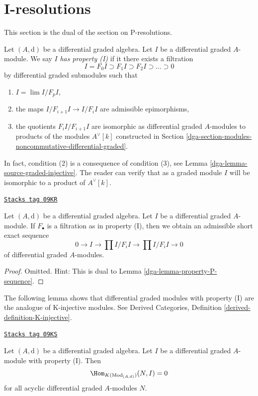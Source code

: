 \section{I-resolutions}
\label{dga-section-I-resolutions}
This section is the dual of the section on P-resolutions.

\medskip\noindent
Let $(A, \text{d})$ be a differential graded algebra.
Let $I$ be a differential graded $A$-module. We say $I$
{\it has property (I)} if it there exists a filtration
$$
I = F_0I \supset F_1I \supset F_2I \supset \ldots \supset 0
$$
by differential graded submodules such that
\begin{enumerate}
\item $I = \lim I/F_pI$,
\item the maps $I/F_{i + 1}I \to I/F_iI$ are admissible epimorphisms,
\item the quotients $F_iI/F_{i + 1}I$ are isomorphic as differential
graded $A$-modules to products of the modules $A^\vee[k]$ constructed
in Section \ref{dga-section-modules-noncommutative-differential-graded}.
\end{enumerate}
In fact, condition (2) is a consequence of condition (3), see
Lemma \ref{dga-lemma-source-graded-injective}. The reader can verify that as
a graded module $I$ will be isomorphic to a product of $A^\vee[k]$.

\begin{lemma}
\label{dga-lemma-property-I-sequence}
\href{https://stacks.math.columbia.edu/tag/09KR}{\texttt{Stacks tag 09KR}}

Let $(A, \text{d})$ be a differential graded algebra.
Let $I$ be a differential graded $A$-module. If $F_\bullet$
is a filtration as in property (I), then we obtain an
admissible short exact sequence
$$
0 \to I \to
\prod\nolimits I/F_iI \to
\prod\nolimits I/F_iI \to 0
$$
of differential graded $A$-modules.
\end{lemma}

\begin{proof}

Omitted. Hint: This is dual to Lemma \ref{dga-lemma-property-P-sequence}.
\end{proof}

The following lemma shows that differential graded modules with
property (I) are the analogue of K-injective modules. See
Derived Categories, Definition \ref{derived-definition-K-injective}.

\begin{lemma}
\label{dga-lemma-property-I-K-injective}
\href{https://stacks.math.columbia.edu/tag/09KS}{\texttt{Stacks tag 09KS}}

Let $(A, \text{d})$ be a differential graded algebra.
Let $I$ be a differential graded $A$-module with property (I).
Then
$$
\Hom_{K(\text{Mod}_{(A, \text{d})})}(N, I) = 0
$$
for all acyclic differential graded $A$-modules $N$.
\end{lemma}

